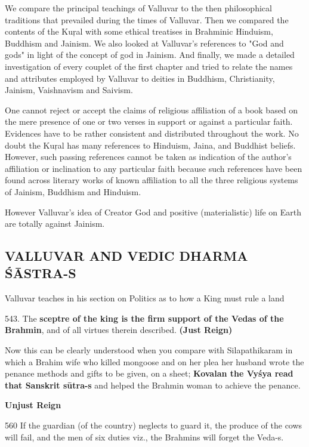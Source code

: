 We compare the principal teachings of Valluvar to the then philosophical traditions that prevailed during the times of Valluvar. Then we compared the contents of the Kuŗal with some ethical treatises in Brahminic Hinduism, Buddhism and Jainism. We also looked at Valluvar's references to "God and gods" in light of the concept of god in Jainism. And finally, we made a detailed investigation of every couplet of the first chapter and tried to relate the names and attributes employed by Valluvar to deities in Buddhism, Christianity, Jainism, Vaishnavism and Saivism.

One cannot reject or accept the claims of religious affiliation of a book based on the mere presence of one or two verses in support or against a particular faith. Evidences have to be rather consistent and distributed throughout the work. No doubt the Kuŗal has many references to Hinduism, Jaina, and Buddhist beliefs. However, such passing references cannot be taken as indication of the author's affiliation or inclination to any particular faith because such references have been found across literary works of known affiliation to all the three religious systems of Jainism, Buddhism and Hinduism.

However Valluvar’s idea of Creator God and positive (materialistic) life on Earth are totally against Jainism.

\subsection*{VALLUVAR AND VEDIC DHARMA ŚĀSTRA-S}

Valluvar teaches in his section on Politics as to how a King must rule a land

543.\endnote{} The \textbf{sceptre of the king is the firm support of the Vedas of the Brahmin}, and of all virtues therein described. \textbf{(Just Reign)}

Now this can be clearly understood when you compare with Silapathikaram\endnote{} in which a Brahim wife who killed mongoose and on her plea her husband wrote the penance methods and gifts to be given, on a sheet; \textbf{Kovalan the Vyśya read that Sanskrit sūtra-s} and helped the Brahmin woman to achieve the penance.

\textbf{Unjust Reign}

560 \endnote{} If the guardian (of the country) neglects to guard it, the produce of the cows will fail, and the men of six duties viz., the Brahmins will forget the Veda-s.

